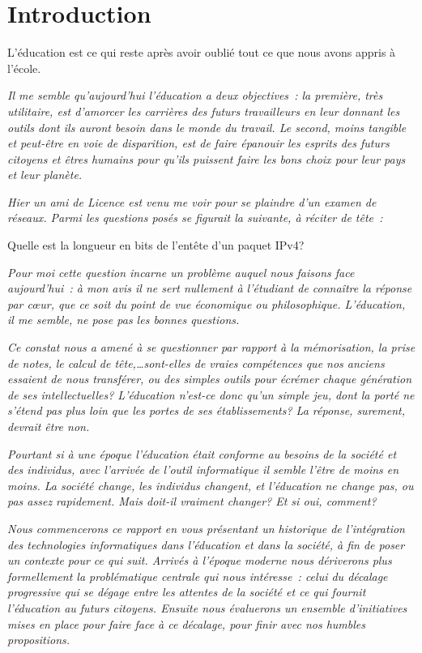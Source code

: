 
\chapter*{Introduction}\label{intro}

\begin{coolquote}
L'éducation est ce qui reste après avoir oublié tout ce que nous avons appris à l'école. 
\end{coolquote}

\textit{Il me semble qu'aujourd'hui l'éducation a deux objectives~: la première, très utilitaire, est d’amorcer les carrières des futurs travailleurs en leur donnant les outils dont ils auront besoin dans le monde du travail. Le second, moins tangible et peut-être en voie de disparition, est de faire épanouir les esprits des futurs citoyens et êtres humains pour qu'ils puissent faire les bons choix pour leur pays et leur planète.}

\textit{Hier un ami de Licence est venu me voir pour se plaindre d'un examen de réseaux. Parmi les questions posés se figurait la suivante, à réciter de tête~:}

\begin{coolquote}Quelle est la longueur en bits de l'entête d'un paquet IPv4?\end{coolquote}

\textit{Pour moi cette question incarne un problème auquel nous faisons face aujourd'hui~: à mon avis il ne sert nullement à l'étudiant de connaître la réponse par c\oe{}ur, que ce soit du point de vue économique ou philosophique. L'éducation, il me semble, ne pose pas les bonnes questions.}

\textit{Ce constat nous a amené à se questionner par rapport à la mémorisation, la prise de notes, le calcul de tête,\ldots sont-elles de vraies compétences que nos anciens essaient de nous transférer, ou des simples outils pour écrémer chaque génération de ses intellectuelles? L'éducation n'est-ce donc qu'un simple jeu, dont la porté ne s'étend pas plus loin que les portes de ses établissements? La réponse, surement, devrait être non.}

\textit{Pourtant si à une époque l'éducation était conforme au besoins de la société et des individus, avec l'arrivée de l'outil informatique il semble l'être de moins en moins. La société change, les individus changent, et l'éducation ne change pas, ou pas assez rapidement. Mais doit-il vraiment changer? Et si oui, comment?}

\textit{Nous commencerons ce rapport en vous présentant un historique de l'intégration des technologies informatiques dans l'éducation et dans la société, à fin de poser un contexte pour ce qui suit. Arrivés à l'époque moderne nous dériverons plus formellement la problématique centrale qui nous intéresse~: celui du décalage progressive qui se dégage entre les attentes de la société et ce qui fournit l'éducation au futurs citoyens. Ensuite nous évaluerons un ensemble d'initiatives mises en place pour faire face à ce décalage, pour finir avec nos humbles propositions.}